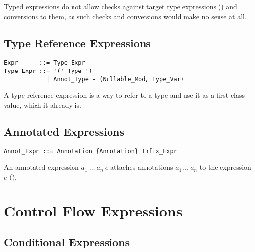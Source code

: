 Typed expressions do not allow checks against target type expressions () and conversions to them, as such checks and conversions would make no sense at all. 





\subsection{Type Reference Expressions}
\label{sec:type-ref-expressions}

\syntax\begin{lstlisting}
Expr      ::= Type_Expr
Type_Expr ::= '(' Type ')'
            | Annot_Type - (Nullable_Mod, Type_Var)
\end{lstlisting}

A type reference expression is a way to refer to a type and use it as a first-class value, which it already is. 






\subsection{Annotated Expressions}
\label{sec:annotated-exprs}

\syntax\begin{lstlisting}
Annot_Expr ::= Annotation {Annotation} Infix_Expr
\end{lstlisting}

An annotated expression $a_1\ \ldots\ a_n\ e$ attaches annotations $a_1\ \ldots\ a_n$ to the expression $e$ (). 





\section{Control Flow Expressions}





\subsection{Conditional Expressions}
\label{sec:conditional-expressions}

